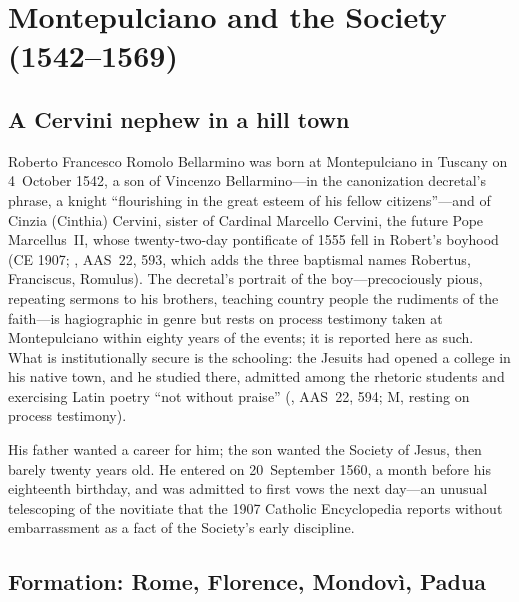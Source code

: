 \section{Montepulciano and the Society (1542--1569)}

\subsection{A Cervini nephew in a hill town}

Roberto Francesco Romolo Bellarmino was born at Montepulciano in
Tuscany on 4~October 1542, a son of Vincenzo Bellarmino---in the
canonization decretal's phrase, a knight ``flourishing in the great
esteem of his fellow citizens''---and of Cinzia (Cinthia) Cervini,
sister of Cardinal Marcello Cervini, the future Pope Marcellus~II,
whose twenty-two-day pontificate of 1555 fell in Robert's boyhood
(CE 1907; , AAS~22, 593, which adds the three
baptismal names Robertus, Franciscus, Romulus). The decretal's
portrait of the boy---precociously pious, repeating sermons to his
brothers, teaching country people the rudiments of the faith---is
hagiographic in genre but rests on process testimony taken at
Montepulciano within eighty years of the events; it is reported here
as such. What is institutionally secure is the schooling: the Jesuits
had opened a college in his native town, and he studied there,
admitted among the rhetoric students and exercising Latin poetry
``not without praise'' (, AAS~22, 594; M, resting on
process testimony).

His father wanted a career for him; the son wanted the Society of
Jesus, then barely twenty years old. He entered on 20~September 1560,
a month before his eighteenth birthday, and was admitted to first
vows the next day---an unusual telescoping of the novitiate that the
1907 Catholic Encyclopedia reports without embarrassment as a fact of
the Society's early discipline.

\subsection{Formation: Rome, Florence, Mondov\`i, Padua}

